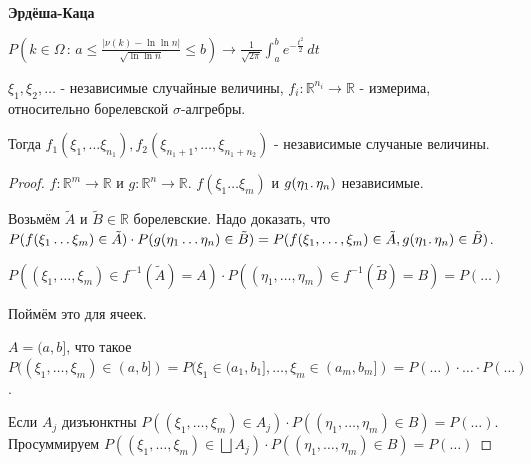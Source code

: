 \begin{remark}
    \begin{theorem}
        \textbf{Эрдёша-Каца}

        $P(k \in \Omega \, : \, a \leqslant \frac{|\nu (k) - \ln \ln n|}{\sqrt{\ln \ln n}} \leqslant b ) \rightarrow \frac{1}{\sqrt{2\pi}} \int_{a}^{b} e^{-\frac{t^2}{2}} \, dt $
    \end{theorem}
\end{remark}


\begin{theorem}
    $\xi_1, \xi_2, \ldots$ - независимые случайные величины, $f_i : \mathbb{R}^{n_i} \to \mathbb{R}$ - измерима, 
    относительно борелевской $\sigma$-алгребры.

    Тогда $f_1 (\xi_1, \ldots \xi_{n_1}), f_2(\xi_{n_1 + 1}, \ldots, \xi_{n_1 + n_2})$ - независимые случаные величины.
\end{theorem}

\begin{proof}
    $f : \mathbb{R}^m \to \mathbb{R}$ и $g : \mathbb{R}^n \to \mathbb{R}$. $f(\xi_1 \ldots \xi_m)$ и 
    $g(\eta_1 \ldotp \eta_n)$ независимые.

    Возьмём $\tilde{A}$ и $\tilde{B} \in \mathbb{R}$ борелевские. Надо доказать, что
    $P(f(\xi_1 \ldots \xi_m) \in \tilde{A}) \cdot P(g(\eta_1 \ldots \eta_n) \in \tilde{B}) = 
    P(f(\xi_1, \ldots, \xi_m) \in \tilde{A}, g(\eta_1 \ldotp \eta_n) \in \tilde{B})$.

    $P((\xi_1, \ldots, \xi_m) \in f^{-1} (\tilde{A}) = A) \cdot P((\eta_1, \ldots, \eta_m) \in f^{-1} (\tilde{B}) = B) = P(\ldots)$

    Поймём это для ячеек.

    $A = (a, b]$, что такое $P((\xi_1, \ldots, \xi_m) \in (a, b]) = P(\xi_1 \in (a_1, b_1], \ldots, \xi_m \in (a_m, b_m]) = P(\ldots) \cdot \ldots \cdot P(\ldots)$.

    Если $A_j$ дизъюнктны $P((\xi_1, \ldots, \xi_m) \in A_j) \cdot P((\eta_1, \ldots, \eta_m) \in B) = P(\ldots).$
    Просуммируем $P((\xi_1, \ldots, \xi_m) \in \bigsqcup A_j) \cdot P((\eta_1, \ldots, \eta_m) \in B) = P(\ldots)$
\end{proof}

